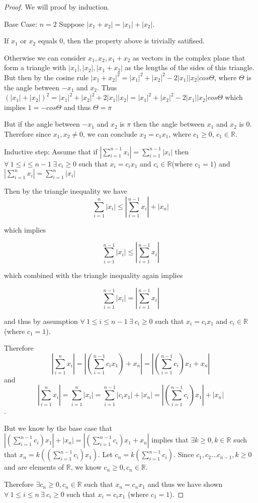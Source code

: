 \documentclass{amsart}
\theoremstyle{definition}
\theoremstyle{remark}
\numberwithin{equation}{section}
\begin{document}
\begin{proof}
We will proof by induction.

Base Case: $n = 2$
Suppose $|x_1 + x_2| = |x_1| + |x_2|$.

If $x_1$ or $x_2$ equals $0$, then the property above is trivially satifised.


Otherwise we can consider $x_1, x_2, x_1 + x_2$ as vectors in the complex plane that form a triangle with $|x_1|, |x_2|, |x_1 + x_2| $ as the lengths of the sides of this triangle.
But then by the cosine rule $|x_1 + x_2|^2 = |x_1|^2 + |x_2|^2 - 2|x_1||x_2|cos\Theta$, where $\Theta$ is the angle between $-x_1$ and $x_2$.
Thus $(|x_1| + |x_2|)^2 = |x_1|^2 + |x_2|^2 + 2|x_1||x_2| = |x_1|^2 + |x_2|^2 - 2|x_1||x_2|cos\Theta$
which implies $1 = -cos\Theta$ and thus $\Theta = \pi$

But if the angle between $-x_1$ and $x_2$ is $\pi$  then the angle between $x_1$ and $x_2$ is $0$.
Therefore since $x_1, x_2 \neq 0$, we can conclude $x_2 = c_1x_1$, where $c_1 \geq 0$, $c_1 \in \mathbb{R}$.






Inductive step:
Assume that if $|\sum_{i = 1}^{n-1} x_i| = \sum_{i = 1}^{n-1}| x_i|$ then $\forall\ 1 \leq i \leq n-1\ \exists\ c_i \geq 0$ such that $x_i = c_ix_1$ and $c_i \in \mathbb{R}$(where $c_1 = 1$)
and $|\sum_{i = 1}^{n} x_i| = \sum_{i = 1}^{n}| x_i|$

Then by the triangle inequality we have
$$ \sum_{i = 1}^{n}| x_i| \leq |\sum_{i = 1}^{n-1} x_i| + | x_n|$$

which implies 

$$ \sum_{i = 1}^{n-1}| x_i| \leq |\sum_{i = 1}^{n-1} x_i|$$

which combined with the triangle inequality again implies 

$$\sum_{i = 1}^{n-1}| x_i| = |\sum_{i = 1}^{n-1} x_i|$$

and thus by assumption $\forall\ 1 \leq i \leq n-1\ \exists\ c_i \geq 0$ such that $x_i = c_ix_1$ and $c_i \in \mathbb{R}$ (where $c_1 = 1$).

Therefore 
$$|\sum_{i = 1}^{n} x_i| = |(\sum_{i = 1}^{n-1} c_ix_1) + x_n| = |(\sum_{i = 1}^{n-1} c_i)x_1 + x_n|$$
and
$$|\sum_{i = 1}^{n} x_i| = \sum_{i = 1}^{n}| x_i| =\sum_{i = 1}^{n-1}|c_i x_1| + |x_n| = |(\sum_{i = 1}^{n-1}c_i )x_1| + |x_n| $$.

But we know by the base case that 
$|(\sum_{i = 1}^{n-1}c_i )x_1| + |x_n| = |(\sum_{i = 1}^{n-1} c_i)x_1 + x_n|$
implies that $\exists k \geq 0, k \in \mathbb{R}$ such that $x_n = k((\sum_{i = 1}^{n-1} c_i)x_1)$.
Let $c_n = k(\sum_{i = 1}^{n-1} c_i)$.
Since $c_1, c_2 \ldots c_{n-1}, k \geq 0$ and are elements of $\mathbb{R}$, we know $c_n \geq 0 , c_n \in \mathbb{R}$.

Therefore $\exists c_n \geq 0, c_n \in \mathbb{R}$ such that $x_n = c_n x_1$ and thus we have shown $\forall\ 1 \leq i \leq n\ \exists\ c_i \geq 0$ such that $x_i = c_ix_1$ (where $c_1 = 1$).


\end{proof}
\end{document}
